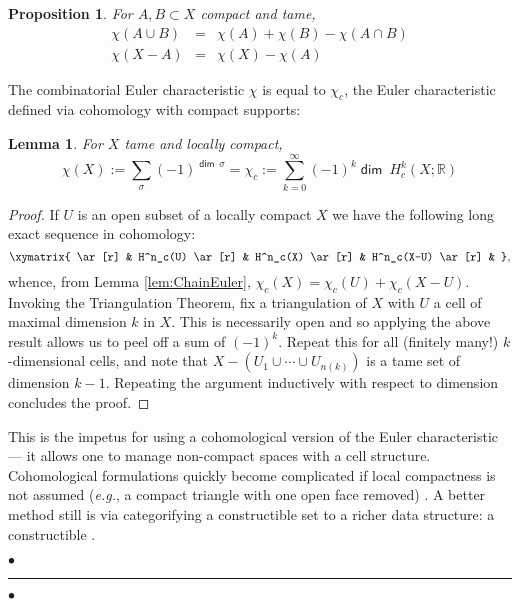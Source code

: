 \documentclass{psapm-l}
\newtheorem{lemma}[theorem]{Lemma}
\newtheorem{proposition}[theorem]{Proposition}
\theoremstyle{definition}
\theoremstyle{remark}
\numberwithin{equation}{section}
\begin{document}
\begin{proposition}
\label{prop:EulerChar}
For $A,B\subset X$ compact and tame,
\begin{eqnarray}
    \chi(A\cup B) &=& \chi(A) + \chi(B) - \chi(A\cap B) \\
    \chi(X - A) &=& \chi(X) - \chi(A)
\end{eqnarray}
\end{proposition}

The combinatorial Euler characteristic $\chi$ is equal to $\chi_c$, the Euler characteristic defined via cohomology with compact supports:
\begin{lemma}
For $X$ tame  and locally compact,
\begin{equation}
   \chi(X) := \sum_{\sigma}(-1)^{{{{\operatorname{\mathsf{{dim}}}}}}\ \sigma} = \chi_c := \sum_{k=0}^\infty(-1)^k{{{\operatorname{\mathsf{{dim}}}}}}\ H^k_c(X;{{\mathbb R}})
\end{equation}
\end{lemma}
\begin{proof}
If $U$ is an open subset of a locally compact $X$ we have the following long exact sequence in cohomology:
\begin{equation}
\displaystyle
\xymatrix{
\ar[r] & H^n_c(U) \ar[r] & H^n_c(X) \ar[r] & H^n_c(X-U) \ar[r] &
}
,
\end{equation}
whence, from Lemma \ref{lem:ChainEuler}, $\chi_c(X)=\chi_c(U)+\chi_c(X-U)$. Invoking the Triangulation Theorem, fix a triangulation of $X$ with $U$ a cell of maximal dimension $k$ in $X$. This is necessarily open and so applying the above result allows us to peel off a sum of $(-1)^k$. Repeat this for all (finitely many!) $k$-dimensional cells, and note that $X-(U_1\cup\cdots\cup U_{n(k)})$ is a tame set of dimension $k-1$. Repeating the argument inductively with respect to dimension concludes the proof.
\end{proof}

This is the impetus for using a cohomological version of the Euler characteristic --- it allows one to manage non-compact spaces with a cell structure. Cohomological formulations quickly become complicated if local compactness is not assumed ({{\em e.g.}}, a compact triangle with one open face removed) \cite{Beke}. A better method still is via categorifying a constructible set to a richer data structure: a constructible {{}}.

{
\begin{center}
\nointerlineskip\vspace{-0.04in}
        $\bullet$\hfill\rule{0.77\linewidth}{1.0pt}\hfill$\bullet$
\par\nointerlineskip\vspace{-0.01in}
\end{center}
}
\vspace{0.1in}
\end{document}
